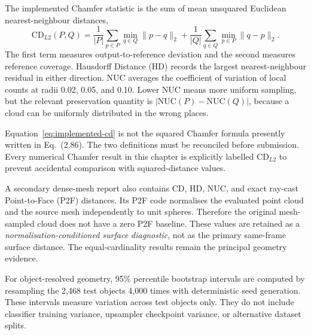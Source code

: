 The implemented Chamfer statistic is the sum of mean unsquared Euclidean nearest-neighbour distances,
\begin{equation}
\mathrm{CD}_{L2}(P,Q)=
\frac{1}{|P|}\sum_{p\in P}\min_{q\in Q}\lVert p-q\rVert_2+
\frac{1}{|Q|}\sum_{q\in Q}\min_{p\in P}\lVert q-p\rVert_2 .
\label{eq:implemented-cd}
\end{equation}
The first term measures output-to-reference deviation and the second measures reference coverage. Hausdorff Distance (HD) records the largest nearest-neighbour residual in either direction. NUC averages the coefficient of variation of local counts at radii 0.02, 0.05, and 0.10. Lower NUC means more uniform sampling, but the relevant preservation quantity is $|\mathrm{NUC}(P)-\mathrm{NUC}(Q)|$, because a cloud can be uniformly distributed in the wrong places.

Equation~\eqref{eq:implemented-cd} is not the squared Chamfer formula presently written in Eq.~(2.86). The two definitions must be reconciled before submission. Every numerical Chamfer result in this chapter is explicitly labelled $\mathrm{CD}_{L2}$ to prevent accidental comparison with squared-distance values.

A secondary dense-mesh report also contains CD, HD, NUC, and exact ray-cast Point-to-Face (P2F) distances. Its P2F code normalises the evaluated point cloud and the source mesh independently to unit spheres. Therefore the original mesh-sampled cloud does not have a zero P2F baseline. These values are retained as a \emph{normalisation-conditioned surface diagnostic}, not as the primary same-frame surface distance. The equal-cardinality results remain the principal geometry evidence.

For object-resolved geometry, 95\% percentile bootstrap intervals are computed by resampling the 2,468 test objects 4,000 times with deterministic seed generation. These intervals measure variation across test objects only. They do not include classifier training variance, upsampler checkpoint variance, or alternative dataset splits.

